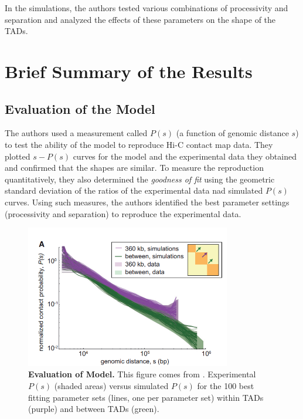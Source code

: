 \documentclass[11pt]{article}
\begin{document}
In the simulations, the authors tested various combinations of processivity and separation and analyzed the effects of these parameters on the shape of the TADs.

\section{Brief Summary of the Results}

\subsection{Evaluation of the Model}

The authors used a measurement called $P(s)$ (a function of genomic distance $s$) to test the ability of the model to reproduce Hi-C contact map data. They plotted $s-P(s)$ curves for the model and the experimental data they obtained and confirmed that the shapes are similar. To measure the reproduction quantitatively, they also determined the \textit{goodness of fit} using the geometric standard deviation of the ratios of the experimental data nad simulated $P(s)$ curves. Using such measures, the authors identified the best parameter settings (processivity and separation) to reproduce the experimental data.

\begin{figure}[htbp]
  \centering
  \includegraphics[width=0.8\textwidth]{assets/Snipaste_2023-01-13_17-49-12.png}
  \caption{\textbf{Evaluation of Model.} This figure comes from \cite{fudenberg_formation_2016}.  Experimental $P(s)$ (shaded areas) versus simulated $P(s)$ for the 100 best fitting parameter sets (lines, one per parameter set) within TADs (purple) and between
  TADs (green).}
  \label{fig: evaluation of model}
\end{figure}
\end{document}
